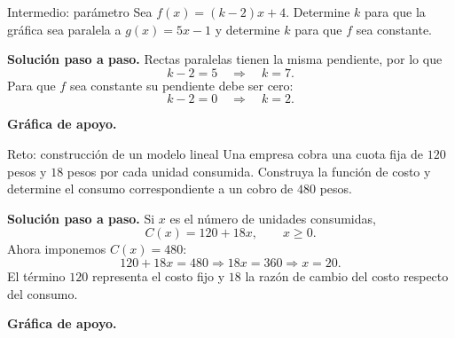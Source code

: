 \documentclass[aspectratio=169,10pt]{beamer}
\begin{document}
\begin{frame}{Intermedio: parámetro}
Sea $f(x)=(k-2)x+4$. Determine $k$ para que la gráfica sea paralela a $g(x)=5x-1$ y determine $k$ para que $f$ sea constante.

\textbf{Solución paso a paso.} Rectas paralelas tienen la misma pendiente, por lo que
\[
k-2=5\quad\Longrightarrow\quad \boxed{k=7}.
\]
Para que $f$ sea constante su pendiente debe ser cero:
\[
k-2=0\quad\Longrightarrow\quad \boxed{k=2}.
\]


\textbf{Gráfica de apoyo.}\medskip
\begin{center}
\end{center}

\end{frame}

\begin{frame}{Reto: construcción de un modelo lineal}
Una empresa cobra una cuota fija de $120$ pesos y $18$ pesos por cada unidad consumida. Construya la función de costo y determine el consumo correspondiente a un cobro de $480$ pesos.

\textbf{Solución paso a paso.} Si $x$ es el número de unidades consumidas,
\[
C(x)=120+18x,\qquad x\ge0.
\]
Ahora imponemos $C(x)=480$:
\[
120+18x=480\Longrightarrow 18x=360\Longrightarrow \boxed{x=20}.
\]
El término $120$ representa el costo fijo y $18$ la razón de cambio del costo respecto del consumo.


\textbf{Gráfica de apoyo.}\medskip
\begin{center}
\end{center}

\end{frame}
\end{document}
